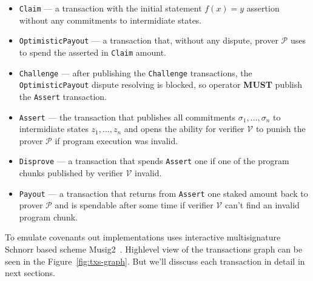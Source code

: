 \documentclass{iacrtrans}
\begin{document}
\begin{itemize}
\item \texttt{Claim} --- a transaction with the initial statement
  $f(x) = y$ assertion without any commitments to intermidiate states.
\item \texttt{OptimisticPayout} --- a transaction that, without any
  dispute, prover $\mathcal{P}$ uses to spend the asserted in \texttt{Claim}
  amount.
\item \texttt{Challenge} --- after publishing the \texttt{Challenge}
  transactions, the \texttt{OptimisticPayout} dispute resolving is
  blocked, so operator \textbf{MUST} publish the \texttt{Assert}
  transaction.
\item \texttt{Assert} --- the transaction that publishes all commitments
  $\sigma_1, \ldots, \sigma_n$ to intermidiate states
  $z_1, \ldots, z_n$ and opens the ability for verifier $\mathcal{V}$ to punish the
  prover $\mathcal{P}$ if program execution was invalid.
\item \texttt{Disprove} --- a transaction that spends \texttt{Assert}
  one if one of the program chunks published by verifier $\mathcal{V}$ invalid.
\item \texttt{Payout} --- a transaction that returns from
  \texttt{Assert} one staked amount back to prover $\mathcal{P}$ and is
  spendable after some time if verifier $\mathcal{V}$ can't find an invalid
  program chunk.
\end{itemize}

To emulate covenants out implementations uses interactive
multisignature Schnorr based scheme Musig2~\cite{musig2}. Highlevel
view of the transactions graph can be seen in the
Figure~\ref{fig:txs-graph}. But we'll disscuss each transaction in
detail in next sections.
\end{document}
